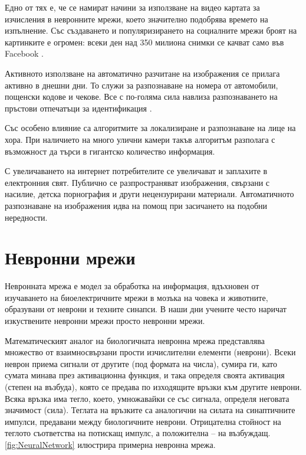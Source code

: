 Едно от тях е, че се намират начини за използване на видео картата за изчисления в невронните мрежи, което значително подобрява времето на изпълнение. Със създаването и популяризирането на социалните мрежи броят на картинките е огромен: всеки ден над 350 милиона снимки се качват само във Facebook \cite{FacebookFacts}.

Активното използване на автоматично разчитане на изображения се прилага активно в днешни дни. То служи за разпознаване на номера от автомобили, пощенски кодове и чекове. Все с по-голяма сила навлиза разпознаването на пръстови отпечатъци за идентификация \cite{Fingerprints}.

Със особено влияние са алгоритмите за локализиране и разпознаване на лице на хора. При наличието на много улични камери такъв алгоритъм разполага с възможност да търси в гигантско количество информация.

С увеличаването на интернет потребителите се увеличават и заплахите в електронния свят. Публично се разпространяват изображения, свързани с насилие, детска порнография и други нецензурирани материали. Автоматичното разпознаване на изображения идва на помощ при засичането на подобни нередности.



\section{Невронни мрежи}

Невронната мрежа е модел за обработка на информация, вдъхновен от изучаването на биоелектричните мрежи в мозъка на човека и животните, образувани от неврони и техните синапси. В наши дни учените често наричат изкуствените невронни мрежи просто невронни мрежи.

Математическият аналог на биологичната невронна мрежа представлява множество от взаимносвързани прости изчислителни елементи (неврони). Всеки неврон приема сигнали от другите (под формата на числа), сумира ги, като сумата минава през активационна функция, и така определя своята активация (степен на възбуда), която се предава по изходящите връзки към другите неврони. Всяка връзка има тегло, което, умножавайки се със сигнала, определя неговата значимост (сила). Теглата на връзките са аналогични на силата на синаптичните импулси, предавани между биологичните неврони. Отрицателна стойност на теглото съответства на потискащ импулс, а положителна – на възбуждащ. \ref{fig:NeuralNetwork} илюстрира примерна невронна мрежа.

